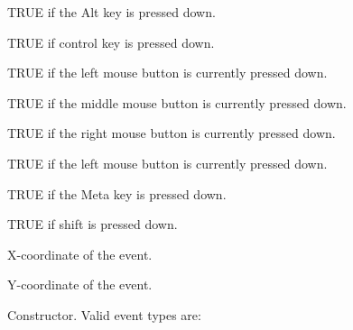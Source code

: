 
TRUE if the Alt key is pressed down.



TRUE if control key is pressed down.



TRUE if the left mouse button is currently pressed down.



TRUE if the middle mouse button is currently pressed down.



TRUE if the right mouse button is currently pressed down.



TRUE if the left mouse button is currently pressed down.



TRUE if the Meta key is pressed down.



TRUE if shift is pressed down.



X-coordinate of the event.



Y-coordinate of the event.



Constructor. Valid event types are:


